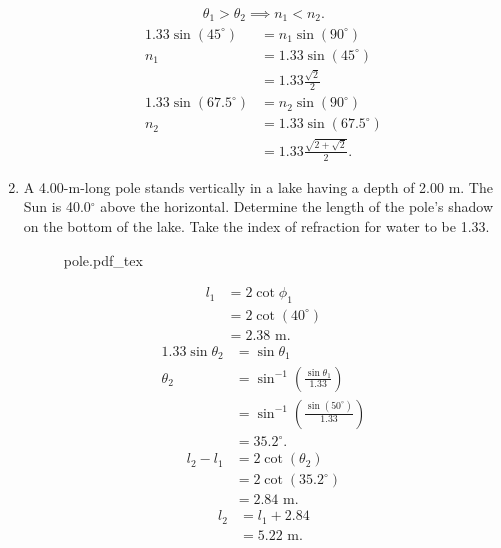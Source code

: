 \documentclass{zc-ust-hw}
\newcommand{\incfig}[1]{%
    \def\svgwidth{\columnwidth}
    {#1.pdf_tex}
}
\begin{document}
\begin{enumerate}
    \begin{sol}
      \begin{align}
        \theta_1 > \theta_2 \implies n_1 < n_2
      .\end{align}
      \begin{align}
        1.33\sin(45^{\circ}) &= n_1\sin(90^{\circ}) \\
        n_1 &= 1.33\sin(45^{\circ}) \\
            &= 1.33\frac{\sqrt{2}}{2} \\
        1.33\sin(67.5^{\circ}) &= n_2\sin(90^{\circ}) \\
        n_2 &= 1.33\sin(67.5^{\circ}) \\
            &= 1.33\frac{\sqrt{2+\sqrt{2}}}{2}
      .\end{align}
    \end{sol}

    \newpage

  \item A 4.00-m-long pole stands vertically in a lake having a depth of 2.00
    m. The Sun is 40.0$^{\circ}$ above the horizontal. Determine the length of the
    pole’s shadow on the bottom of the lake. Take the index of refraction for
    water to be 1.33. 

    \begin{figure}[ht]
      \centering
      \incfig{pole}
      \caption{}
      \label{fig:pole}
    \end{figure}

    \begin{sol}
      \begin{align}
        l_1 &= 2\cot\phi_1 \\
            &= 2\cot(40^{\circ}) \\
            &= 2.38\text{ m}
      .\end{align}
      \begin{align}
        1.33\sin\theta_2 &= \sin\theta_1 \\
        \theta_2 &= \sin^{-1}\left( \frac{\sin\theta_1}{1.33} \right) \\
                 &= \sin^{-1}\left( \frac{\sin(50^{\circ})}{1.33} \right) \\
                 &= 35.2^{\circ}
      .\end{align}
      \begin{align}
        l_2 - l_1 &= 2\cot(\theta_2) \\
                  &= 2\cot(35.2^{\circ}) \\
                  &= 2.84\text{ m}
      .\end{align}
      \begin{align}
        l_2 &= l_1 + 2.84 \\
            &= 5.22\text{ m}
      .\end{align}
    \end{sol}

\end{enumerate}
\end{document}
